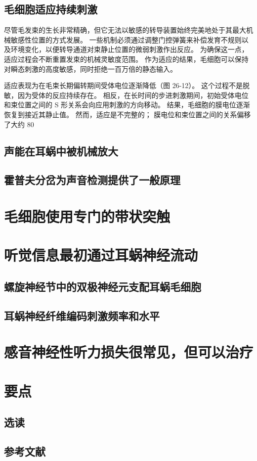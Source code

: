 \subsection{毛细胞适应持续刺激}
尽管毛发束的生长非常精确，但它无法以敏感的转导装置始终完美地处于其最大机械敏感性位置的方式发展。 一些机制必须通过调整门控弹簧来补偿发育不规则以及环境变化，以便转导通道对束静止位置的微弱刺激作出反应。 为确保这一点，适应过程会不断重置发束的机械灵敏度范围。 作为适应的结果，毛细胞可以保持对瞬态刺激的高度敏感，同时拒绝一百万倍的静态输入。

适应表现为在毛束长期偏转期间受体电位逐渐降低（图 26-12）。 这个过程不是脱敏，因为受体的反应持续存在。 相反，在长时间的步进刺激期间，初始受体电位和束位置之间的 S 形关系会向应用刺激的方向移动。 结果，毛细胞的膜电位逐渐恢复到接近其静止值。 然而，适应是不完整的； 膜电位和束位置之间的关系偏移了大约 80%

\subsection{声能在耳蜗中被机械放大}


\subsection{霍普夫分岔为声音检测提供了一般原理}

\section{毛细胞使用专门的带状突触}

\section{听觉信息最初通过耳蜗神经流动}
\subsection{螺旋神经节中的双极神经元支配耳蜗毛细胞}
\subsection{耳蜗神经纤维编码刺激频率和水平}

\section{感音神经性听力损失很常见，但可以治疗}

\section{要点}
\subsection{选读}
\subsection{参考文献}